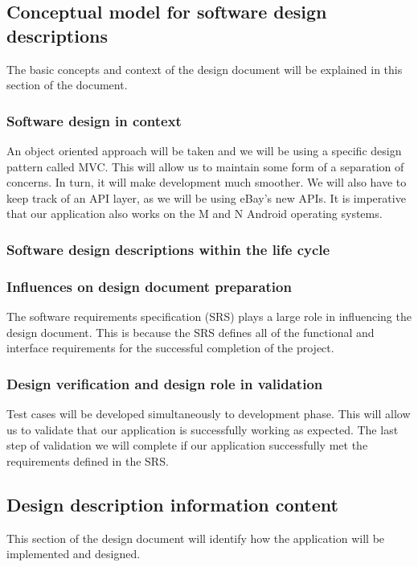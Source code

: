 \documentclass[journal,compsoc, 10pt, draftclsnofoot, onecolumn]{IEEEtran}
\begin{document}
\subsection{Conceptual model for software design descriptions}
The basic concepts and context of the design document will be explained in this 
section of the document.

\subsubsection{Software design in context}
An object oriented approach will be taken and we will be using a specific 
design pattern called MVC. This will allow us to maintain some form of a 
separation of concerns. In turn, it will make development much smoother. We will
 also have to keep track of an API layer, as we will be using eBay's new APIs. 
It is imperative that our application also works on the M and N Android 
operating systems.

\subsubsection{Software design descriptions within the life cycle}
\subsubsection*{Influences on design document preparation}
The software requirements specification (SRS) plays a large role in influencing 
the design document. This is because the SRS defines all of the functional and 
interface requirements for the successful completion of the project.

\subsubsection*{Design verification and design role in validation}
Test cases will be developed simultaneously to development phase. This will 
allow us to validate that our application is successfully working as expected. 
The last step of validation we will complete if our application successfully 
met the requirements defined in the SRS.


\subsection{Design description information content}
This section of the design document will identify how the application will be 
implemented and designed. 
\end{document}
